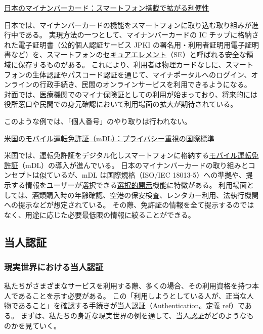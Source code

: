 \documentclass[uplatex]{jsarticle}
\def\ref#1{ref}%
\def\label#1{}%
\begin{document}
\underline{日本のマイナンバーカード：スマートフォン搭載で拡がる利便性}

\begin{exa}[マイナンバーカードのスマートフォン搭載]\label{exa:ch2-mynumber-smartphone}
日本では、マイナンバーカードの機能をスマートフォンに取り込む取り組みが進行中である。
実現方法の一つとして、マイナンバーカードの IC チップに格納された電子証明書（公的個人認証サービス JPKI の署名用・利用者証明用電子証明書など）を、スマートフォンの\underline{セキュアエレメント}（SE）と呼ばれる安全な領域に保存するものがある。
これにより、利用者は物理カードなしに、スマートフォンの生体認証やパスコード認証を通じて、マイナポータルへのログイン、オンラインの行政手続き、民間のオンラインサービスを利用できるようになる。
対面では、医療機関でのマイナ保険証としての利用が始まっており、将来的には役所窓口や民間での身元確認において利用場面の拡大が期待されている。
\end{exa}

\begin{rem}[個人番号はやり取りされない]\label{rem:ch2-no-individual-number}
このような例では、「個人番号」のやり取りは行われない。
\end{rem}

\underline{米国のモバイル運転免許証（mDL）：プライバシー重視の国際標準}

\begin{exa}\label{exa:ch2-mdl}
米国では、運転免許証をデジタル化しスマートフォンに格納する\underline{モバイル運転免許証}（mDL）の導入が進んでいる。
日本のマイナンバーカードの取り組みとコンセプトは似ているが、mDL は国際規格（ISO/IEC 18013-5）への準拠や、提示する情報をユーザーが選択できる\underline{選択的開示}機能に特徴がある。
利用場面としては、酒類購入時の年齢確認、空港の保安検査、レンタカー利用、法執行機関への提示などが想定されている。
その際、免許証の情報を全て提示するのではなく、用途に応じた必要最低限の情報に絞ることができる。
\end{exa}

\subsection{当人認証}\label{subsec:ch2-authentication}

\subsubsection{現実世界における当人認証}

私たちがさまざまなサービスを利用する際、多くの場合、その利用資格を持つ本人であることを示す必要がある。
この「利用しようとしている人が、正当な人物であること」を確認する手続きが当人認証（Authentication。定義 \ref{dfn:authentication}）である。
まずは、私たちの身近な現実世界の例を通して、当人認証がどのようなものかを見ていく。
\end{document}
